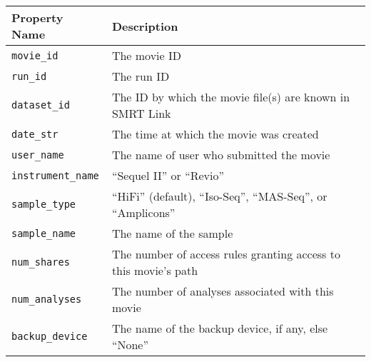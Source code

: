 \begin{tabularx}{\textwidth}{l|X}
\hline
 Property Name   & Description                                                     \\
\hline
 \texttt{movie\_id}        & The movie ID                                                    \\
 \texttt{run\_id}          & The run ID                                                      \\
 \texttt{dataset\_id}      & The ID by which the movie file(s) are known in SMRT Link        \\
 \texttt{date\_str}        & The time at which the movie was created                         \\
 \texttt{user\_name}       & The name of user who submitted the movie                        \\
 \texttt{instrument\_name} & ``Sequel II'' or ``Revio''                                      \\
 \texttt{sample\_type}     & ``HiFi'' (default), ``Iso-Seq'', ``MAS-Seq'', or ``Amplicons''  \\
 \texttt{sample\_name}     & The name of the sample                                          \\
 \texttt{num\_shares}      & The number of access rules granting access to this movie's path \\
 \texttt{num\_analyses}    & The number of analyses associated with this movie               \\
 \texttt{backup\_device}   & The name of the backup device, if any, else ``None''            \\
\hline
\end{tabularx}
